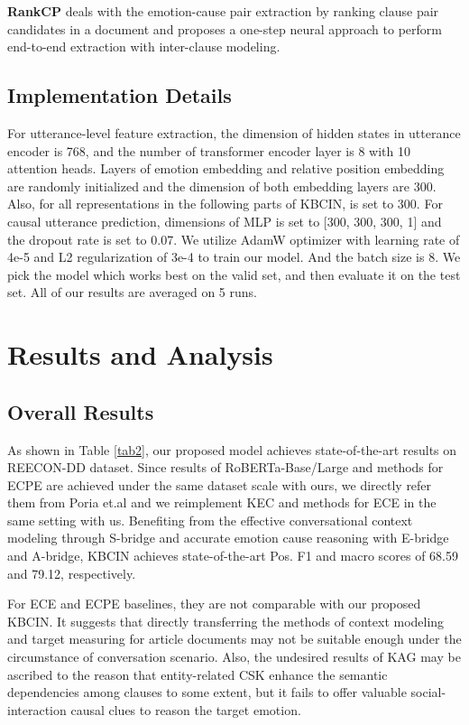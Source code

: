 \documentclass[letterpaper]{article} \usepackage{aaai23}  \usepackage{times}  \usepackage{helvet}  \usepackage{courier}  \usepackage[hyphens]{url}  \usepackage{graphicx} \urlstyle{rm} \def\UrlFont{\rm}  \usepackage{natbib}  \usepackage{caption} \frenchspacing  \setlength{\pdfpagewidth}{8.5in} \setlength{\pdfpageheight}{11in} \usepackage{algorithm}
\begin{document}
\textbf{RankCP} \cite{rankcp} deals with the emotion-cause pair extraction by ranking clause pair candidates in a document and proposes a one-step neural approach to perform end-to-end extraction with inter-clause modeling.

\subsection{Implementation Details}
For utterance-level feature extraction, the dimension of hidden states in utterance encoder is 768, and the number of transformer encoder layer is 8 with 10 attention heads. Layers of emotion embedding and relative position embedding are randomly initialized and the dimension of both embedding layers are 300. Also, for all representations in the following parts of KBCIN,  is set to 300. For causal utterance prediction, dimensions of MLP is set to [300, 300, 300, 1] and the dropout rate is set to 0.07. We utilize AdamW optimizer with learning rate of 4e-5 and L2 regularization of 3e-4 to train our model. And the batch size is 8. We pick the model which works best on the valid set, and then evaluate it on the test set. All of our results are averaged on 5 runs.

\section{Results and Analysis}
\subsection{Overall Results}
As shown in Table \ref{tab2}, our proposed model achieves state-of-the-art results on REECON-DD dataset. Since results of RoBERTa-Base/Large and methods for ECPE are achieved under the same dataset scale with ours, we directly refer them from Poria et.al  and we reimplement KEC and methods for ECE in the same setting with us. Benefiting from the effective conversational context modeling through S-bridge and accurate emotion cause reasoning with E-bridge and A-bridge, KBCIN achieves state-of-the-art Pos. F1 and macro scores of 68.59 and 79.12, respectively.

For ECE and ECPE baselines, they are not comparable with our proposed KBCIN. It suggests that directly transferring the methods of context modeling and target measuring for article documents may not be suitable enough under the circumstance of conversation scenario. Also, the undesired results of KAG may be ascribed to the reason that entity-related CSK enhance the semantic dependencies among clauses to some extent, but it fails to offer valuable social-interaction causal clues to reason the target emotion.
\end{document}
